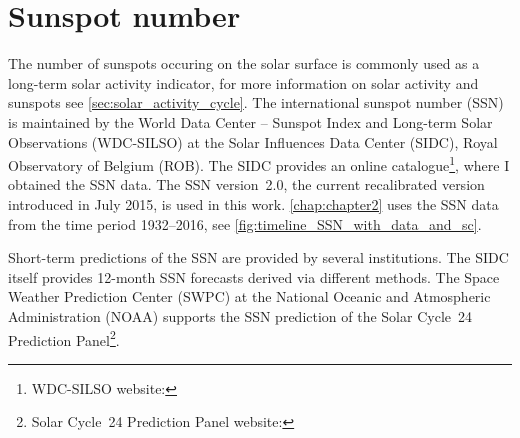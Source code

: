 \section{Sunspot number}
\label{sec:sunspot_number}
The number of sunspots occuring on the solar surface is commonly used as a long-term solar activity indicator, for more information on solar activity and sunspots see \autoref{sec:solar_activity_cycle}. The international sunspot number (SSN) is maintained by the World Data Center -- Sunspot Index and Long-term Solar Observations (WDC-SILSO) at the Solar Influences Data Center (SIDC), Royal Observatory of Belgium (ROB). The SIDC provides an online catalogue\footnote{WDC-SILSO website: }, where I obtained the SSN data. The SSN version~2.0, the current recalibrated version introduced in July 2015, is used in this work. \autoref{chap:chapter2} uses the SSN data from the time period 1932--2016, see \autoref{fig:timeline_SSN_with_data_and_sc}.

Short-term predictions of the SSN are provided by several institutions. The SIDC itself provides 12-month SSN forecasts derived via different methods. The Space Weather Prediction Center (SWPC) at the National Oceanic and Atmospheric Administration (NOAA) supports the SSN prediction of the Solar Cycle~24 Prediction Panel\footnote{Solar Cycle~24 Prediction Panel website: }.


